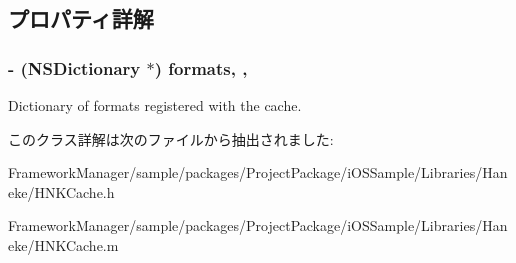 \subsection{プロパティ詳解}
\hypertarget{interface_h_n_k_cache_a26177b583cb0fbc469732f304304ae63}{}
\subsubsection[{formats}]{\setlength{\rightskip}{0pt plus 5cm}-\/ (N\+S\+Dictionary $\ast$) formats\hspace{0.3cm}{\ttfamily [read]}, {\ttfamily [nonatomic]}, {\ttfamily [assign]}}\label{interface_h_n_k_cache_a26177b583cb0fbc469732f304304ae63}
Dictionary of formats registered with the cache. 

このクラス詳解は次のファイルから抽出されました\+:\begin{DoxyCompactItemize}
\item 
Framework\+Manager/sample/packages/\+Project\+Package/i\+O\+S\+Sample/\+Libraries/\+Haneke/H\+N\+K\+Cache.\+h\item 
Framework\+Manager/sample/packages/\+Project\+Package/i\+O\+S\+Sample/\+Libraries/\+Haneke/H\+N\+K\+Cache.\+m\end{DoxyCompactItemize}
